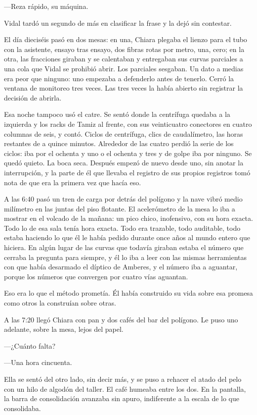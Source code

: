 ---Reza rápido, su máquina.

Vidal tardó un segundo de más en clasificar la frase y la dejó sin contestar.

El día dieciséis pasó en dos mesas: en una, Chiara plegaba el lienzo para el tubo con la asistente, ensayo tras ensayo, dos fibras rotas por metro, una, cero; en la otra, las fracciones giraban y se calentaban y entregaban sus curvas parciales a una cola que Vidal se prohibió abrir. Los parciales sesgaban. Un dato a medias era peor que ninguno: uno empezaba a defenderlo antes de tenerlo. Cerró la ventana de monitoreo tres veces. Las tres veces la había abierto sin registrar la decisión de abrirla.

Esa noche tampoco usó el catre. Se sentó donde la centrífuga quedaba a la izquierda y los racks de Tamiz al frente, con sus veinticuatro conectores en cuatro columnas de seis, y contó. Ciclos de centrífuga, clics de caudalímetro, las horas restantes de a quince minutos. Alrededor de las cuatro perdió la serie de los ciclos: iba por el ochenta y uno o el ochenta y tres y de golpe iba por ninguno. Se quedó quieto. La boca seca. Después empezó de nuevo desde uno, sin anotar la interrupción, y la parte de él que llevaba el registro de sus propios registros tomó nota de que era la primera vez que hacía eso.

A las 6:40 pasó un tren de carga por detrás del polígono y la nave vibró medio milímetro en las juntas del piso flotante. El acelerómetro de la mesa lo iba a mostrar en el volcado de la mañana: un pico chico, inofensivo, con su hora exacta. Todo lo de esa sala tenía hora exacta. Todo era trazable, todo auditable, todo estaba haciendo lo que él le había pedido durante once años al mundo entero que hiciera. En algún lugar de las curvas que todavía giraban estaba el número que cerraba la pregunta para siempre, y él lo iba a leer con las mismas herramientas con que había desarmado el díptico de Amberes, y el número iba a aguantar, porque los números que convergen por cuatro vías aguantan.

Eso era lo que el método prometía. Él había construido su vida sobre esa promesa como otros la construían sobre otras.

A las 7:20 llegó Chiara con pan y dos cafés del bar del polígono. Le puso uno adelante, sobre la mesa, lejos del papel.

---¿Cuánto falta?

---Una hora cincuenta.

Ella se sentó del otro lado, sin decir más, y se puso a rehacer el atado del pelo con un hilo de algodón del taller. El café humeaba entre los dos. En la pantalla, la barra de consolidación avanzaba sin apuro, indiferente a la escala de lo que consolidaba.

